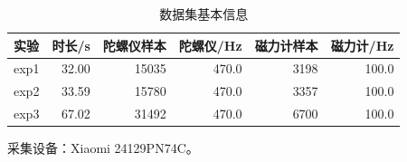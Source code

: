 \begin{table}[H]
\centering
\begin{tabular}{lrrrrr}
\toprule
实验 & 时长/s & 陀螺仪样本 & 陀螺仪/Hz & 磁力计样本 & 磁力计/Hz \\
\midrule
exp1 & 32.00 & 15035 & 470.0 & 3198 & 100.0 \\
exp2 & 33.59 & 15780 & 470.0 & 3357 & 100.0 \\
exp3 & 67.02 & 31492 & 470.0 & 6700 & 100.0 \\
\bottomrule
\end{tabular}

{\vspace{0.4em}\small 采集设备：Xiaomi 24129PN74C。\par}
\caption{数据集基本信息}
\label{tab:metadata}
\end{table}
